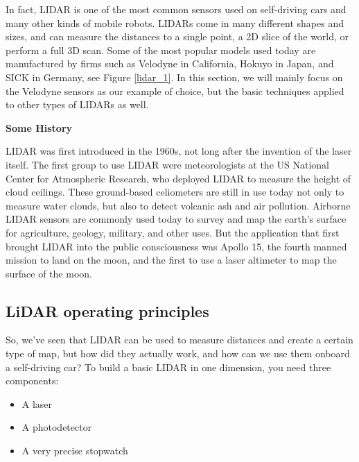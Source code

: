 In fact, LIDAR is one of the most common sensors used on self-driving cars and many other kinds of mobile robots. 
LIDARs come in many different shapes and sizes, and can measure the distances to a single point, 
a 2D slice of the world, or perform a full 3D scan. Some of the most popular models used today are manufactured by firms such
as Velodyne in California, Hokuyo in Japan, and SICK in Germany, see Figure \ref{lidar_1}. In this section, we will mainly focus on the Velodyne sensors as
our example of choice, but the basic techniques applied
to other types of LIDARs as well. 


\begin{framed}
\theoremstyle{remark}
\begin{remark}{\textbf{Some History}}

LIDAR was first introduced in the 1960s, not long after the invention
of the laser itself. The first group to use
LIDAR were meteorologists at the US National Center
for Atmospheric Research, who deployed LIDAR to measure
the height of cloud ceilings. These ground-based
celiometers are still in use today not only to
measure water clouds, but also to detect volcanic ash
and air pollution. Airborne LIDAR sensors are
commonly used today to survey and map the earth's
surface for agriculture, geology, military, and other uses. But the application that
first brought LIDAR into the public
consciousness was Apollo 15, the fourth manned mission
to land on the moon, and the first to use a laser altimeter
to map the surface of the moon. 
\end{remark}
\end{framed}

\subsection{LiDAR operating principles}

So, we've seen that LIDAR can be used to measure distances and create
a certain type of map, but how did they actually work, and how can we use them
onboard a self-driving car? To build a basic LIDAR in one dimension, you need three components:

\begin{itemize}
\item A laser
\item A photodetector
\item A very precise stopwatch
\end{itemize}

